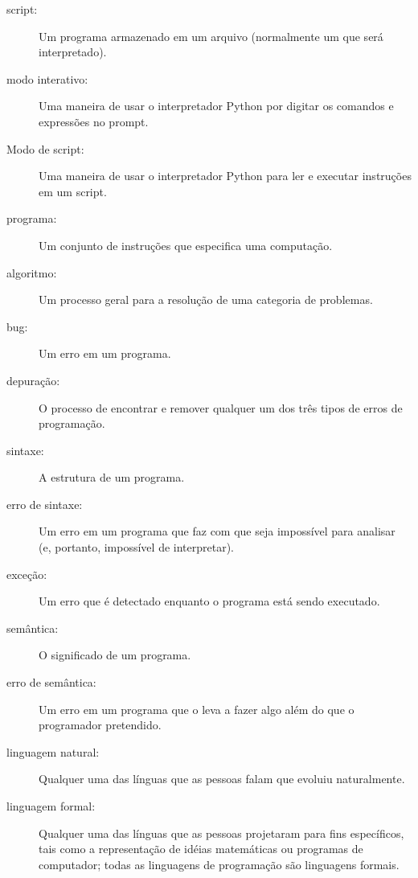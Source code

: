 \documentclass[10pt]{book}
\begin{document}
\begin{description}
\item[script:] Um programa armazenado em um arquivo (normalmente um que será
interpretado).

\item[modo interativo:] Uma maneira de usar o interpretador Python por
digitar os comandos e expressões no prompt.

\item[Modo de script:] Uma maneira de usar o interpretador Python para ler
e executar instruções em um script.

\item[programa:] Um conjunto de instruções que especifica uma computação.

\item[algoritmo:] Um processo geral para a resolução de uma categoria de
problemas.

\item[bug:] Um erro em um programa.

\item[depuração:] O processo de encontrar e remover qualquer um dos
três tipos de erros de programação.

\item[sintaxe:] A estrutura de um programa.

\item[erro de sintaxe:] Um erro em um programa que faz com que seja impossível
para analisar (e, portanto, impossível de interpretar).

\item[exceção:] Um erro que é detectado enquanto o programa está sendo executado.

\item[semântica:] O significado de um programa.

\item[erro de semântica:] Um erro em um programa que o leva a fazer algo
além do que o programador pretendido.

\item[linguagem natural:] Qualquer uma das línguas que as pessoas falam que
evoluiu naturalmente.

\item[linguagem formal:] Qualquer uma das línguas que as pessoas projetaram
para fins específicos, tais como a representação de idéias matemáticas ou
programas de computador; todas as linguagens de programação são linguagens formais.


\end{description}
\end{document}
